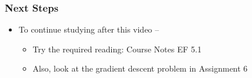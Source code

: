 \documentclass[10pt,english,aspectratio=169]{beamer}
\begin{document}
\begin{frame} \frametitle{Next Steps}

\begin{itemize}
\setlength\itemsep{5mm}
\item To continue studying after this video -- \vspace{2mm}

\begin{itemize}
 \setlength\itemsep{3mm}
 \item Try the required reading: Course Notes EF 5.1
 \item Also, look at the gradient descent problem in Assignment 6
\end{itemize}
\end{itemize}


\end{frame}
\end{document}
